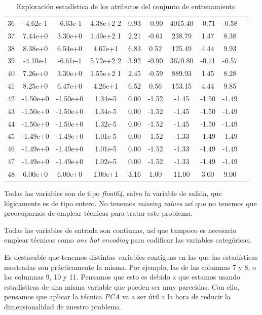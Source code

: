 \documentclass[11pt]{article}
\begin{document}
\begin{table}[H]
{\begin{tabular}{|c|c|c|c|c|c|c|c|c|c|}
36  & -4.62e-1 & -6.63e-1  & 4.38e+2  2& 0.93  & -0.90&   4015.40& -0.71&  -0.58 \\
37  &  7.44e+0 &  3.30e+0  & 1.49e+2  1& 2.21  & -0.61&    238.79&  1.47&   8.38 \\
38  &  8.38e+0 &  6.54e+0  & 4.67e+1   & 6.83  &  0.52&    125.49&  4.44&   9.93 \\
39  & -4.10e-1 & -6.61e-1  & 5.72e+2  2& 3.92  & -0.90&   3670.80& -0.71&  -0.57 \\
40  &  7.26e+0 &  3.30e+0  & 1.55e+2  1& 2.45  & -0.59&    889.93&  1.45&   8.28 \\
41  &  8.25e+0 &  6.47e+0  & 4.26e+1   & 6.52  &  0.56&    153.15&  4.44&   9.85 \\
42  & -1.50e+0 & -1.50e+0  & 1.34e-5   & 0.00  & -1.52&     -1.45& -1.50&  -1.49 \\
43  & -1.50e+0 & -1.50e+0  & 1.34e-5   & 0.00  & -1.52&     -1.45& -1.50&  -1.49 \\
44  & -1.50e+0 & -1.50e+0  & 1.32e-5   & 0.00  & -1.52&     -1.45& -1.50&  -1.49 \\
45  & -1.49e+0 & -1.49e+0  & 1.01e-5   & 0.00  & -1.52&     -1.33& -1.49&  -1.49 \\
46  & -1.49e+0 & -1.49e+0  & 1.01e-5   & 0.00  & -1.52&     -1.33& -1.49&  -1.49 \\
47  & -1.49e+0 & -1.49e+0  & 1.02e-5   & 0.00  & -1.52&     -1.33& -1.49&  -1.49 \\
48  &  6.00e+0 &  6.00e+0  & 1.00e+1   & 3.16  &  1.00&     11.00&  3.00&   9.00 \\
\hline
\end{tabular}}
    \caption{Exploración estadística de los atributos del conjunto de entrenamiento}
    \label{variables_clasificacion}
\end{table}

Todas las variables son de tipo \emph{float64}, salvo la variable de salida, que lógicamente es de tipo entero. No tenemos \emph{missing values} así que no tenemos que preocuparnos de emplear técnicas para tratar este problema.

Todas las variables de entrada son contiunas, así que tampoco es necesario emplear técnicas como \emph{one hot encoding} para codificar las variables categóricas.

Es destacable que tenemos distintas variables contiguas en las que las estadísticas mostradas son prácticamente la misma. Por ejemplo, las de las columnas 7 y 8, o las columnas 9, 10 y 11. Pensamos que esto es debido a que estamos usando estadísticas de una misma variable que pueden ser muy parecidas. Con ello, pensamos que aplicar la técnica \emph{PCA} va a ser útil a la hora de reducir la dimensionalidad de nuestro problema.
\end{document}

